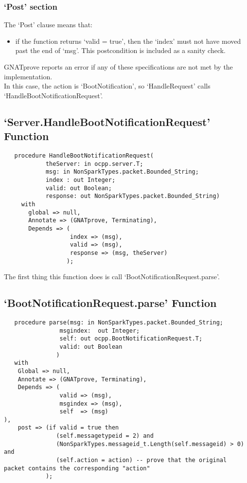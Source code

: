 \documentclass[12pt,openany,a4paper]{book}
\begin{document}
\subsubsection{`Post' section}
The `Post' clause means that:
\begin{itemize}
\item if the function returns `valid = true', then the `index' must not have moved past the end of `msg'. This postcondition is included as a sanity check. 
\end{itemize}

GNATprove reports an error if any of these specifications are not met by the implementation.\\

In this case, the action is `BootNotification', so `HandleRequest' calls `HandleBootNotificationRequest'.






\subsection{`Server.HandleBootNotificationRequest' Function}
\begin{verbatim}
   procedure HandleBootNotificationRequest(
   			theServer: in ocpp.server.T;
            msg: in NonSparkTypes.packet.Bounded_String;
            index : out Integer;
            valid: out Boolean;
            response: out NonSparkTypes.packet.Bounded_String)
     with
       global => null,
       Annotate => (GNATprove, Terminating),
       Depends => (
                   index => (msg),
                   valid => (msg),
                   response => (msg, theServer)
                  );
\end{verbatim}
The first thing this function does is call `BootNotificationRequest.parse'.


\subsection{`BootNotificationRequest.parse' Function}
\begin{verbatim}
   procedure parse(msg: in NonSparkTypes.packet.Bounded_String;
                msgindex:  out Integer;
                self: out ocpp.BootNotificationRequest.T;
                valid: out Boolean
               )
   with
    Global => null,
    Annotate => (GNATprove, Terminating),
    Depends => (
                valid => (msg),
                msgindex => (msg),
                self  => (msg)
),
    post => (if valid = true then
               (self.messagetypeid = 2) and
               (NonSparkTypes.messageid_t.Length(self.messageid) > 0) and
               (self.action = action) -- prove that the original packet contains the corresponding "action"
            );

\end{verbatim}
\end{document}
